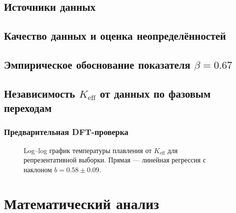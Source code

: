 \documentclass[12pt,a4paper]{article}
\theoremstyle{remark}
\begin{document}
	\subsection{Источники данных}
	\subsection{Качество данных и оценка неопределённостей}
	\subsection{Эмпирическое обоснование показателя \(\beta = 0.67\)}
	\subsection{Независимость \(K_{\mathrm{eff}}\) от данных по фазовым переходам}
	\subsubsection{Предварительная DFT-проверка}
	
	\begin{figure}[htbp]
		\centering
		\caption{Log–log график температуры плавления от \(K_{\mathrm{eff}}\) для репрезентативной выборки. Прямая — линейная регрессия с наклоном \(b = 0.58\pm0.09\).}
		\label{fig:tmelt_fit}
	\end{figure}
	
	\section{Математический анализ}
\end{document}
